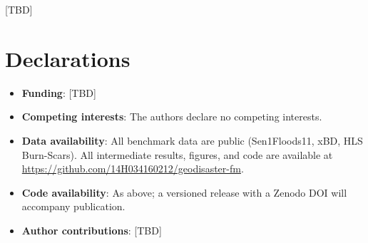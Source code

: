 \documentclass[sn-nature,lineno]{sn-jnl}
\theoremstyle{thmstyleone}
\theoremstyle{thmstyletwo}
\theoremstyle{thmstylethree}
\begin{document}
[TBD]

\section*{Declarations}
\begin{itemize}
\item \textbf{Funding}: [TBD]
\item \textbf{Competing interests}: The authors declare no competing
  interests.
\item \textbf{Data availability}: All benchmark data are public
  (Sen1Floods11, xBD, HLS Burn-Scars). All intermediate results,
  figures, and code are available at
  \url{https://github.com/14H034160212/geodisaster-fm}.
\item \textbf{Code availability}: As above; a versioned release with a
  Zenodo DOI will accompany publication.
\item \textbf{Author contributions}: [TBD]
\end{itemize}

\clearpage



\end{document}
